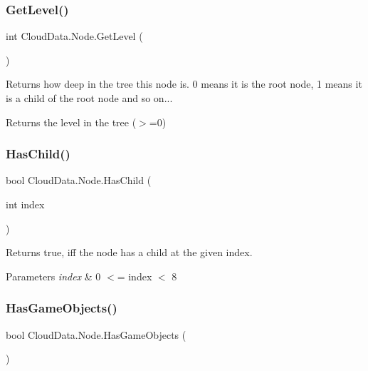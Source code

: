 \subsubsection{\texorpdfstring{Get\+Level()}{GetLevel()}}
{\footnotesize\ttfamily int Cloud\+Data.\+Node.\+Get\+Level (\begin{DoxyParamCaption}{ }\end{DoxyParamCaption})\hspace{0.3cm}{\ttfamily [inline]}}



Returns how deep in the tree this node is. 0 means it is the root node, 1 means it is a child of the root node and so on... 

\begin{DoxyReturn}{Returns}
the level in the tree ($>$=0)
\end{DoxyReturn}
\mbox{\label{class_cloud_data_1_1_node_a42e31008a7772d196ce770ff2244cc26}} 
\subsubsection{\texorpdfstring{Has\+Child()}{HasChild()}}
{\footnotesize\ttfamily bool Cloud\+Data.\+Node.\+Has\+Child (\begin{DoxyParamCaption}\item[{int}]{index }\end{DoxyParamCaption})\hspace{0.3cm}{\ttfamily [inline]}}



Returns true, iff the node has a child at the given index. 


\begin{DoxyParams}{Parameters}
{\em index} & 0 $<$= index $<$ 8\\
\hline
\end{DoxyParams}
\mbox{\label{class_cloud_data_1_1_node_aa253c61651daa14e2377ddb189f56320}} 
\subsubsection{\texorpdfstring{Has\+Game\+Objects()}{HasGameObjects()}}
{\footnotesize\ttfamily bool Cloud\+Data.\+Node.\+Has\+Game\+Objects (\begin{DoxyParamCaption}{ }\end{DoxyParamCaption})\hspace{0.3cm}{\ttfamily [inline]}}



